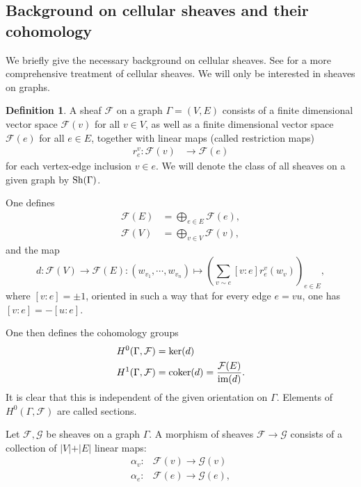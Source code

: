 \documentclass{article}
\theoremstyle{definition}
\newtheorem{definition}[theorem]{Definition}
\theoremstyle{remark}
\begin{document}
\subsection{Background on cellular sheaves and their cohomology}\label{sec: Background - sheaves}
We briefly give the necessary background on cellular sheaves. See \cite{currysheaves, Hansen2019} for a more comprehensive treatment of cellular sheaves. We will only be interested in sheaves on graphs. 
\begin{definition}
A sheaf $\mathcal{F}$ on a graph $\Gamma=(V,E)$ consists of a finite dimensional vector space $\mathcal{F}(v)$ for all $v\in V$, as well as a finite dimensional vector space $\mathcal{F}(e)$ for all $e\in E$, together with linear maps (called restriction maps)
\begin{align*}
r^{v}_{e}: \mathcal{F}(v) &\rightarrow \mathcal{F}(e)
\end{align*}
for each vertex-edge inclusion $v\in e$. We will denote the class of all sheaves on a given graph by $\textup{Sh}(\Gamma)$. 
\end{definition}
One defines 
\begin{align*}
    \mathcal{F}(E) &= \bigoplus_{e\in E} \mathcal{F}(e),\\
    \mathcal{F}(V) &= \bigoplus_{v\in V} \mathcal{F}(v),
\end{align*}
and the map
\begin{equation}
d : \mathcal{F}(V) \rightarrow \mathcal{F}(E): (w_{v_1}, \cdots, w_{v_n}) \mapsto (\sum_{v \sim e} [v:e]r^{v}_{e}(w_v))_{e\in E},
\end{equation}
where $[v:e] =\pm 1$, oriented in such a way that for every edge $e=vu$, one has $[v:e]= -[u:e]$.

One then defines the cohomology groups
\begin{align*}
    H^{0}(\Gamma, \mathcal{F}) &= \ker(d)\\
    H^{1}(\Gamma, \mathcal{F}) &= \text{coker}(d) = \frac{\mathcal{F}(E)}{\textup{im}(d)}.
\end{align*}
It is clear that this is independent of the given orientation on $\Gamma$. Elements of $H^{0}(\Gamma, \mathcal{F})$ are called sections.

Let $\mathcal{F}, \mathcal{G}$ be sheaves on a graph $\Gamma$. A morphism of sheaves $\mathcal{F}\rightarrow \mathcal{G}$ consists of a collection of $\vert V\vert +\vert E\vert$ linear maps:
\begin{align*}
   \alpha_v:& \mathcal{F}(v)\rightarrow \mathcal{G}(v)\\
   \alpha_e:& \mathcal{F}(e)\rightarrow \mathcal{G}(e),
\end{align*}
\end{document}

